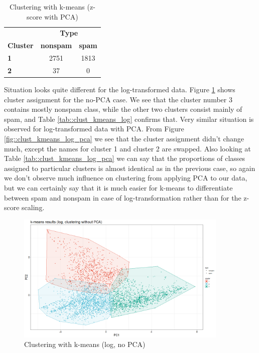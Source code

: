 \documentclass{article}
\begin{document}
	\begin{table}[h]
		\centering
		\begin{tabular}{lcc}
			& \multicolumn{2}{c}{\textbf{Type}} \\
			\textbf{Cluster} & \textbf{nonspam} & \textbf{spam} \\
			\textbf{1} & 2751 & 1813 \\
			\textbf{2} & 37 & 0 \\
		\end{tabular}
		\caption{Clustering with k-means (z-score with PCA)}
		\label{tab::clust_kmeans_scaled_pca}
	\end{table}

	Situation looks quite different for the log-transformed data. Figure \ref{fig::clust_kmeans_log} shows cluster assignment for the
	no-PCA case. We see that the cluster number 3 contains mostly nonspam class, while the other two clusters consist mainly of spam, and
	Table \ref{tab::clust_kmeans_log} confirms that. Very similar situation is observed for log-transformed data with PCA. From Figure
	\ref{fig::clust_kmeans_log_pca} we see that the cluster assignment didn't change much, except the names for cluster 1 and cluster 2 are swapped.
	Also looking at Table \ref{tab::clust_kmeans_log_pca} we can say that the proportions of classes assigned to particular clusters is almost identical
	as in the previous case, so again we don't observe much influence on clustering from applying PCA to our data, but we can certainly say
	that it is much easier for k-means to differentiate between spam and nonspam in case of log-transformation rather than for the z-score scaling.

	\begin{figure}[h]
		\centering
		\includegraphics[width=0.9\textwidth]{proj2_plots/kmeans_res_log.png}
		\caption{Clustering with k-means (log, no PCA)}
		\label{fig::clust_kmeans_log}
	\end{figure}
\end{document}
